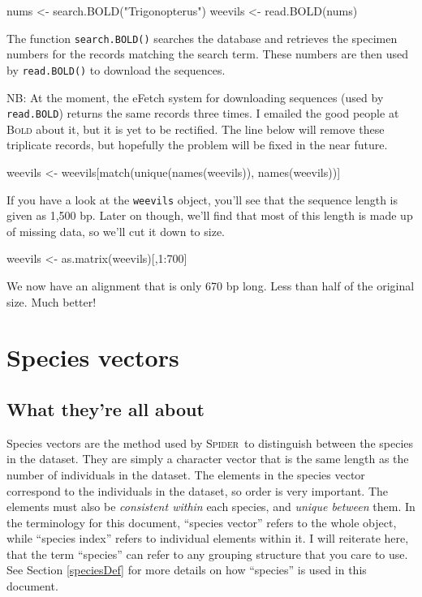 \documentclass{article}
\newcommand{\spider}{\textsc{Spider}~} %
\newcommand{\progname}[1]{\textsc{#1}}
\newcommand{\fun}[1]{\texttt{#1}}
\begin{document}
\begin{console}
nums <- search.BOLD("Trigonopterus")
weevils <- read.BOLD(nums)
\end{console}

The function \fun{search.BOLD()} searches the database and retrieves the specimen numbers for the records matching the search term. These numbers are then used by \fun{read.BOLD()} to download the sequences.

NB: At the moment, the eFetch system for downloading sequences (used by \fun{read.BOLD}) returns the same records three times. I emailed the good people at \progname{Bold} about it, but it is yet to be rectified. The line below will remove these triplicate records, but hopefully the problem will be fixed in the near future.

\begin{console}
weevils <- weevils[match(unique(names(weevils)), names(weevils))]
\end{console}

If you have a look at the \fun{weevils} object, you'll see that the sequence length is given as 1,500 bp. Later on though, we'll find that most of this length is made up of missing data, so we'll cut it down to size.

\begin{console}
weevils <- as.matrix(weevils)[,1:700]
\end{console}

We now have an alignment that is only 670 bp long. Less than half of the original size. Much better!



\section{Species vectors}
\label{species.vectors}

\subsection{What they're all about}
Species vectors are the method used by \spider to distinguish between the species in the dataset. They are simply a character vector that is the same length as the number of individuals in the dataset. The elements in the species vector correspond to the individuals in the dataset, so order is very important. The elements must also be \emph{consistent within} each species, and \emph{unique between} them. In the terminology for this document, ``species vector'' refers to the whole object, while ``species index'' refers to individual elements within it. I will reiterate here, that the term ``species'' can refer to any grouping structure that you care to use. See Section \ref{speciesDef} for more details on how ``species'' is used in this document.
\end{document}
